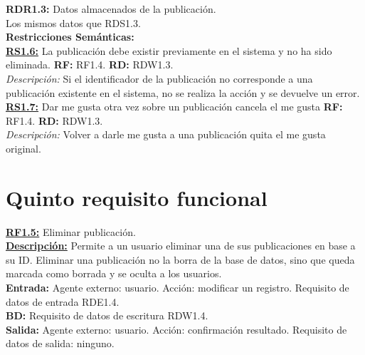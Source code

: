 \textcolor{azul}{\textbf{RDR1.3:}} Datos almacenados de la publicación. \\
\hspace*{1cm} Los mismos datos que RDS1.3. \\

\textbf{\textcolor{verde}{Restricciones Semánticas:}} \\[6pt]
\textbf{\textcolor{verde}{\underline{RS1.6:}}} La publicación debe existir previamente en el sistema y no ha sido eliminada. \textbf{RF:} RF1.4. \textbf{RD:} RDW1.3. \\
\hspace*{1cm} \textit{Descripción:} Si el identificador de la publicación no corresponde
a una publicación existente en el sistema, no se realiza la acción y se devuelve un error. \\[12pt]

\textbf{\textcolor{verde}{\underline{RS1.7:}}} Dar me gusta otra vez sobre un publicación cancela el me gusta 
\textbf{RF:} RF1.4. \textbf{RD:} RDW1.3. \\
\hspace*{1cm} \textit{Descripción:} Volver a darle me gusta a una publicación quita el me gusta original.
\newpage

\section{Quinto requisito funcional}
\textbf{\textcolor{rojo}{\underline{RF1.5:}}} Eliminar publicación. \\[6pt]

\textbf{\textcolor{rojo}{\underline{Descripción:}}} Permite a un usuario eliminar 
una de sus publicaciones en base a su ID. Eliminar una publicación no la borra de la base de datos,
sino que queda marcada como borrada y se oculta a los usuarios.\\[6pt]

\textbf{\textcolor{rojo}{Entrada:}} Agente externo: usuario. Acción: modificar un registro. 
Requisito de datos de entrada \textcolor{azul}{RDE1.4}. \\[6pt]

\textbf{\textcolor{rojo}{BD:}} Requisito de datos de escritura \textcolor{azul}{RDW1.4}.\\ [6pt] 

\textbf{\textcolor{rojo}{Salida:}} Agente externo: usuario. Acción: confirmación resultado. 
Requisito de datos de salida: ninguno. \\[12pt]

